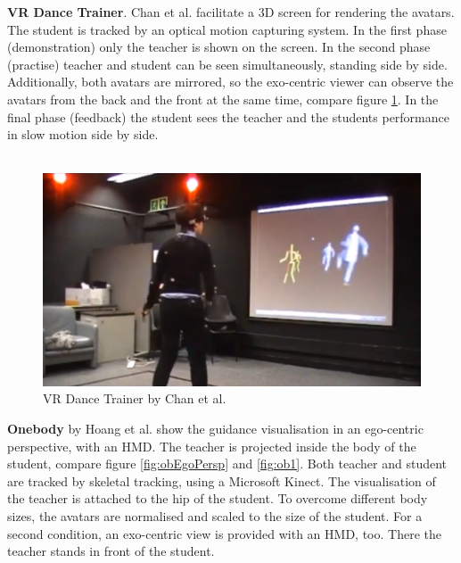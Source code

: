 \textbf{VR Dance Trainer}. Chan et al. \cite{Chan2010} facilitate a 3D screen for rendering the avatars. The student is tracked by an optical motion capturing system. In the first phase (demonstration) only the teacher is shown on the screen. In the second phase (practise) teacher and student can be seen simultaneously, standing side by side. Additionally, both avatars are mirrored, so the exo-centric viewer can observe the avatars from the back and the front at the same time, compare figure \ref{fig:vrdtPerspectives}. In the final phase (feedback) the student sees the teacher and the students performance in slow motion side by side.\\ \\
\begin{figure}
	\centering
	\includegraphics[width=1.0\textwidth]{img/VRDanceTrainerPerspective.png}
	\caption{VR Dance Trainer by Chan et al. \cite{Chan2010}}
	\label{fig:vrdtPerspectives}
\end{figure}
\textbf{Onebody} by Hoang et al. \cite{Hoang2016} show the guidance visualisation in an ego-centric perspective, with an HMD. The teacher is projected inside the body of the student, compare figure \ref{fig:obEgoPersp} and \ref{fig:ob1}. Both teacher and student are tracked by skeletal tracking, using a Microsoft Kinect. The visualisation of the teacher is attached to the hip of the student. To overcome different body sizes, the avatars are normalised and scaled to the size of the student. For a second condition, an exo-centric view is provided with an HMD, too. There the teacher stands in front of the student.\\ \\
